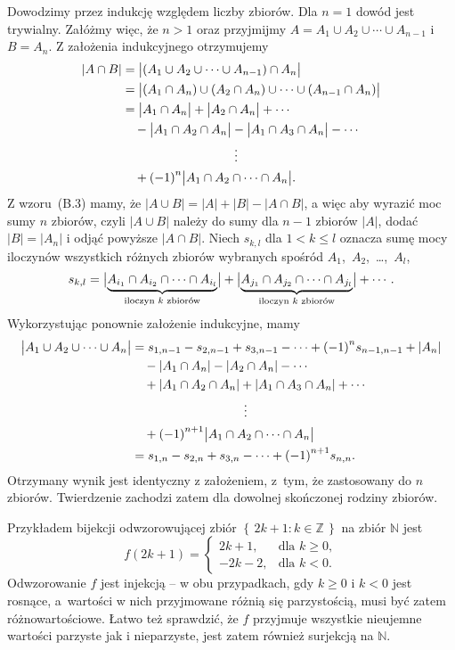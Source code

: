 \exercise %
Dowodzimy przez indukcję względem liczby zbiorów. Dla $n=1$ dowód jest trywialny. Załóżmy więc, że $n>1$ oraz przyjmijmy $A=A_1\cup A_2\cup\cdots\cup A_{n-1}$ i $B=A_n$. Z założenia indukcyjnego otrzymujemy
\[
	\begin{split}
		|A\cap B| &= \bigl|(A_1\cup A_2\cup\cdots\cup A_{n-1})\cap A_n\bigr| \\
		&= \bigl|(A_1\cap A_n)\cup(A_2\cap A_n)\cup\cdots\cup(A_{n-1}\cap A_n)\bigr| \\
		&= \bigl|A_1\cap A_n\bigr|+\bigl|A_2\cap A_n\bigr|+\cdots \\
		&\quad -\bigl|A_1\cap A_2\cap A_n\bigr|-\bigl|A_1\cap A_3\cap A_n\bigr|-\cdots \\
		&\hspace{1.25in}\vdots \\
		&\quad +{(-1)}^n\bigl|A_1\cap A_2\cap\cdots\cap A_n\bigr|.
	\end{split}
\]
Z wzoru~(B.3) mamy, że $|A\cup B|=|A|+|B|-|A\cap B|$, a więc aby wyrazić moc sumy $n$ zbiorów, czyli $|A\cup B|$ należy do sumy dla $n-1$ zbiorów $|A|$, dodać $|B|=|A_n|$ i odjąć powyższe $|A\cap B|$. Niech $s_{k,l}$ dla $1<k\le l$ oznacza sumę mocy iloczynów wszystkich  różnych zbiorów wybranych spośród $A_1$,~$A_2$,~\dots,~$A_l$,
\[
	s_{k,l} = \bigl|\underbrace{A_{i_1}\cap A_{i_2}\cap\cdots\cap A_{i_l}}_{\text{\scriptsize iloczyn $k$ zbiorów}}\bigr|+\bigl|\underbrace{A_{j_1}\cap A_{j_2}\cap\cdots\cap A_{j_l}}_{\text{\scriptsize iloczyn $k$ zbiorów}}\bigr|+\cdots.
\]
Wykorzystując ponownie założenie indukcyjne, mamy
\[
	\begin{split}
		\bigl|A_1\cup A_2\cup\cdots\cup A_n\bigr| &= s_{1,{n-1}}-s_{2,{n-1}}+s_{3,{n-1}}-\cdots+{(-1)}^ns_{{n-1},{n-1}}+|A_n| \\
		&\quad -|A_1\cap A_n|-|A_2\cap A_n|-\cdots \\
		&\quad +|A_1\cap A_2\cap A_n|+|A_1\cap A_3\cap A_n|+\cdots \\
		&\hspace{1.25in}\vdots \\
		&\quad +{(-1)}^{n+1}\bigl|A_1\cap A_2\cap\cdots\cap A_n\bigr| \\
		&= s_{1,n}-s_{2,n}+s_{3,n}-\cdots+{(-1)}^{n+1}s_{n,n}.
	\end{split}
\]
Otrzymany wynik jest identyczny z założeniem, z~tym, że zastosowany do $n$ zbiorów. Twierdzenie zachodzi zatem dla dowolnej skończonej rodziny zbiorów.

\exercise %
Przykładem bijekcji odwzorowującej zbiór $\left\{\,2k+1:k\in\mathbb{Z}\,\right\}$ na zbiór $\mathbb{N}$ jest
\[
	f(2k+1) =
	\begin{cases}
		2k+1, & \text{dla $k\ge0$}, \\
		-2k-2, & \text{dla $k<0$}.
	\end{cases}
\]
Odwzorowanie $f$ jest injekcją -- w obu przypadkach, gdy $k\ge0$ i $k<0$ jest rosnące, a~wartości w nich przyjmowane różnią się parzystością, musi być zatem różnowartościowe. Łatwo też sprawdzić, że $f$ przyjmuje wszystkie nieujemne wartości parzyste jak i nieparzyste, jest zatem również surjekcją na $\mathbb{N}$.

